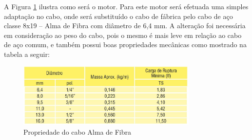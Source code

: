 A Figura \ref{img:motorescolhido} ilustra como será o motor. Para este motor será efetuada uma simples adaptação no cabo, onde será substituído o cabo de fábrica pelo cabo de aço classe 8x19 – Alma de Fibra com diâmetro de 6,4 mm. A alteração foi necessária em consideração ao peso do cabo, pois o mesmo é mais leve em relação ao cabo de aço comum, e também possui boas propriedades mecânicas como mostrado na tabela a seguir:

\begin{figure}[H]
	\centering
	\includegraphics[width=0.8\textwidth]{figuras/tabelacabo}
	\caption[Propriedade do cabo Alma de Fibra]{Propriedade do cabo Alma de Fibra~\cite{acrocabo}}
	\label{img:motorescolhido}
\end{figure}
